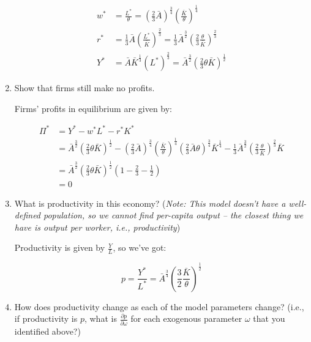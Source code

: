\documentclass{article}
\newenvironment{solution}{\color{red}}{\color{black}}
\begin{document}
\begin{enumerate}
\begin{solution}
\begin{align*}
w^{*} &= \frac{L^{*}}{\theta} = \left(\frac23 \bar{A} \right)^\frac34 \left(\frac{\bar{K}}{\theta} \right)^\frac14 \\
r^{*} &= \frac13 \bar{A} \left(\frac{L^{*}}{\bar{K}} \right)^\frac23 = \frac13 \bar{A}^\frac32 \left(\frac23 \frac{\theta}{\bar{K}} \right)^\frac23 \\
Y^{*} &= \bar{A} \bar{K}^\frac13 \left(L^{*} \right)^\frac23 = \bar{A}^\frac32 \left(\frac23 \theta \bar{K} \right)^\frac12
\end{align*}
\end{solution}

\item Show that firms still make no profits.

\begin{solution}
Firms' profits in equilibrium are given by:

\begin{align*}
\Pi^{*} &= Y^{*} - w^{*} L^{*} - r^{*} K^{*} \\
 &= \bar{A}^\frac32 \left(\frac23 \theta \bar{K} \right)^\frac12 - \left(\frac23 \bar{A} \right)^\frac34 \left(\frac{\bar{K}}{\theta} \right)^\frac14 \left(\frac23 \bar{A} \theta \right)^\frac34 \bar{K}^\frac14  - \frac13 \bar{A}^\frac32 \left(\frac23 \frac{\theta}{\bar{K}} \right)^\frac23 \bar{K} \\
 &= \bar{A}^\frac32 \left(\frac23 \theta \bar{K} \right)^\frac12 \left(1 - \frac23 - \frac12 \right) \\
 &= 0
\end{align*}
\end{solution}

\item What is productivity in this economy? (\textit{Note: This model doesn't have a well-defined population, so we cannot find per-capita output -- the closest thing we have is output per worker, i.e., productivity})

\begin{solution}
Productivity is given by $\frac{Y}{L}$, so we've got:

\[ p = \frac{Y^{*}}{L^{*}} = \bar{A}^\frac34 \left(\frac32 \frac{\bar{K}}{\theta} \right)^\frac12 \]
\end{solution}

\item How does productivity change as each of the model parameters change? (i.e., if productivity is $p$, what is $\frac{\partial p}{\partial \omega}$ for each exogenous parameter $\omega$ that you identified above?)


\end{enumerate}
\end{document}
